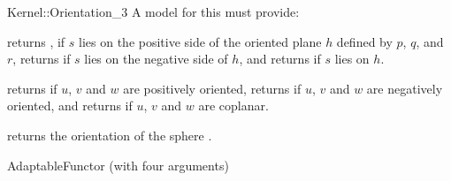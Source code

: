 \begin{ccRefFunctionObjectConcept}{Kernel::Orientation_3}
A model for this must provide:


{returns , if $s$ lies on the positive side of the oriented 
plane $h$ defined by $p$, $q$, and $r$, returns  if $s$ 
lies on the negative side of $h$, and returns  if $s$ lies
on $h$.}

{returns  if $u$, $v$ and $w$ are positively oriented,
returns  if $u$, $v$ and $w$ are negatively oriented,
and returns  if $u$, $v$ and $w$ are coplanar.}


{returns the orientation of the sphere .}

\ccRefines
AdaptableFunctor (with four arguments)

\ccSeeAlso
{} \\

\end{ccRefFunctionObjectConcept}
